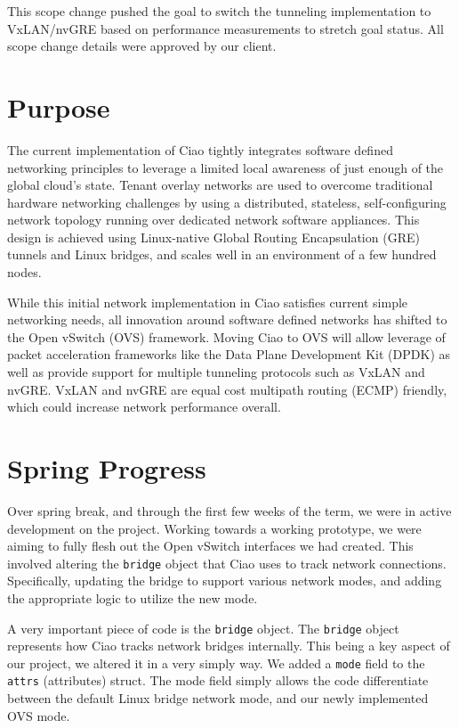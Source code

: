 \documentclass[10pt,onecolumn,journal,draftclsnofoot]{IEEEtran}
\begin{document}
This scope change pushed the goal to switch the tunneling implementation to
VxLAN/nvGRE based on performance measurements to stretch goal status. All scope
change details were approved by our client.

\section{Purpose}

The current implementation of Ciao tightly integrates software defined
networking principles to leverage a limited local awareness of just enough of
the global cloud's state. Tenant overlay networks are used to overcome
traditional hardware networking challenges by using a distributed, stateless,
self-configuring network topology running over dedicated network software
appliances. This design is achieved using Linux-native Global Routing
Encapsulation (GRE) tunnels and Linux bridges, and scales well in an environment
of a few hundred nodes.

While this initial network implementation in Ciao satisfies current simple
networking needs, all innovation around software defined networks has
shifted to the Open vSwitch (OVS) framework. Moving Ciao to OVS will allow
leverage of packet acceleration frameworks like the Data Plane Development Kit
(DPDK) as well as provide support for multiple tunneling protocols such as VxLAN
and nvGRE. VxLAN and nvGRE are equal cost multipath routing (ECMP) friendly,
which could increase network performance overall.

\section{Spring Progress}
Over spring break, and through the first few weeks of the term, we were in active
development on the project. Working towards a working prototype, we were aiming
to fully flesh out the Open vSwitch interfaces we had created. This involved
altering the \texttt{bridge} object that Ciao uses to track network connections.
Specifically, updating the bridge to support various network modes, and adding
the appropriate logic to utilize the new mode.

A very important piece of code is the \texttt{bridge} object. The \texttt{bridge}
object represents how Ciao tracks network bridges internally. This being a key
aspect of our project, we altered it in a very simply way. We added a \texttt{mode}
field to the \texttt{attrs} (attributes) struct. The mode field simply allows
the code differentiate between the default Linux bridge network mode, and our
newly implemented OVS mode. 
\end{document}
